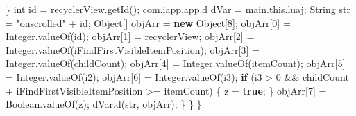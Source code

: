 \documentclass[
]{article}
\newenvironment{Shaded}{}{}
\newcommand{\BuiltInTok}[1]{\textcolor[rgb]{0.00,0.50,0.00}{#1}}
\newcommand{\ControlFlowTok}[1]{\textcolor[rgb]{0.00,0.44,0.13}{\textbf{#1}}}
\newcommand{\DataTypeTok}[1]{\textcolor[rgb]{0.56,0.13,0.00}{#1}}
\newcommand{\DecValTok}[1]{\textcolor[rgb]{0.25,0.63,0.44}{#1}}
\newcommand{\FunctionTok}[1]{\textcolor[rgb]{0.02,0.16,0.49}{#1}}
\newcommand{\KeywordTok}[1]{\textcolor[rgb]{0.00,0.44,0.13}{\textbf{#1}}}
\newcommand{\NormalTok}[1]{#1}
\newcommand{\OperatorTok}[1]{\textcolor[rgb]{0.40,0.40,0.40}{#1}}
\newcommand{\StringTok}[1]{\textcolor[rgb]{0.25,0.44,0.63}{#1}}
\begin{document}
\begin{Shaded}
\begin{Highlighting}[]
                \OperatorTok{\}}
                \DataTypeTok{int}\NormalTok{ id }\OperatorTok{=}\NormalTok{ recyclerView}\OperatorTok{.}\FunctionTok{getId}\OperatorTok{();}
\NormalTok{                com}\OperatorTok{.}\FunctionTok{iapp}\OperatorTok{.}\FunctionTok{app}\OperatorTok{.}\FunctionTok{d}\NormalTok{ dVar }\OperatorTok{=}\NormalTok{ main}\OperatorTok{.}\FunctionTok{this}\OperatorTok{.}\FunctionTok{luaj}\OperatorTok{;}
                \BuiltInTok{String}\NormalTok{ str }\OperatorTok{=} \StringTok{"onscrolled"} \OperatorTok{+}\NormalTok{ id}\OperatorTok{;}
                \BuiltInTok{Object}\OperatorTok{[]}\NormalTok{ objArr }\OperatorTok{=} \KeywordTok{new} \BuiltInTok{Object}\OperatorTok{[}\DecValTok{8}\OperatorTok{];}
\NormalTok{                objArr}\OperatorTok{[}\DecValTok{0}\OperatorTok{]} \OperatorTok{=} \BuiltInTok{Integer}\OperatorTok{.}\FunctionTok{valueOf}\OperatorTok{(}\NormalTok{id}\OperatorTok{);}
\NormalTok{                objArr}\OperatorTok{[}\DecValTok{1}\OperatorTok{]} \OperatorTok{=}\NormalTok{ recyclerView}\OperatorTok{;}
\NormalTok{                objArr}\OperatorTok{[}\DecValTok{2}\OperatorTok{]} \OperatorTok{=} \BuiltInTok{Integer}\OperatorTok{.}\FunctionTok{valueOf}\OperatorTok{(}\NormalTok{iFindFirstVisibleItemPosition}\OperatorTok{);}
\NormalTok{                objArr}\OperatorTok{[}\DecValTok{3}\OperatorTok{]} \OperatorTok{=} \BuiltInTok{Integer}\OperatorTok{.}\FunctionTok{valueOf}\OperatorTok{(}\NormalTok{childCount}\OperatorTok{);}
\NormalTok{                objArr}\OperatorTok{[}\DecValTok{4}\OperatorTok{]} \OperatorTok{=} \BuiltInTok{Integer}\OperatorTok{.}\FunctionTok{valueOf}\OperatorTok{(}\NormalTok{itemCount}\OperatorTok{);}
\NormalTok{                objArr}\OperatorTok{[}\DecValTok{5}\OperatorTok{]} \OperatorTok{=} \BuiltInTok{Integer}\OperatorTok{.}\FunctionTok{valueOf}\OperatorTok{(}\NormalTok{i2}\OperatorTok{);}
\NormalTok{                objArr}\OperatorTok{[}\DecValTok{6}\OperatorTok{]} \OperatorTok{=} \BuiltInTok{Integer}\OperatorTok{.}\FunctionTok{valueOf}\OperatorTok{(}\NormalTok{i3}\OperatorTok{);}
                \ControlFlowTok{if} \OperatorTok{(}\NormalTok{i3 }\OperatorTok{\textgreater{}} \DecValTok{0} \OperatorTok{\&\&}\NormalTok{ childCount }\OperatorTok{+}\NormalTok{ iFindFirstVisibleItemPosition }\OperatorTok{\textgreater{}=}\NormalTok{ itemCount}\OperatorTok{)} \OperatorTok{\{}
\NormalTok{                    z }\OperatorTok{=} \KeywordTok{true}\OperatorTok{;}
                \OperatorTok{\}}
\NormalTok{                objArr}\OperatorTok{[}\DecValTok{7}\OperatorTok{]} \OperatorTok{=} \BuiltInTok{Boolean}\OperatorTok{.}\FunctionTok{valueOf}\OperatorTok{(}\NormalTok{z}\OperatorTok{);}
\NormalTok{                dVar}\OperatorTok{.}\FunctionTok{d}\OperatorTok{(}\NormalTok{str}\OperatorTok{,}\NormalTok{ objArr}\OperatorTok{);}
            \OperatorTok{\}}
        \OperatorTok{\}}
    \OperatorTok{\}}


\end{Highlighting}
\end{Shaded}
\end{document}
